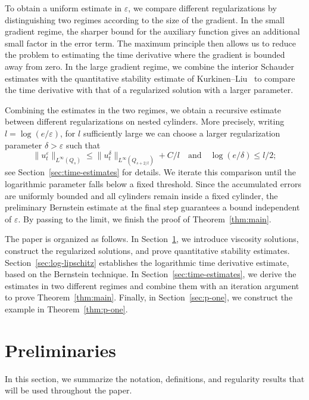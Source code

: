 \documentclass[a4paper,11pt]{amsart}
\theoremstyle{plain}
\theoremstyle{definition}
\numberwithin{equation}{section}
\begin{document}
To obtain a uniform estimate in $\varepsilon$, we compare different regularizations by distinguishing two regimes according to the size of the gradient. In the small gradient regime, the sharper bound for the auxiliary function gives an additional small factor in the error term. The maximum principle then allows us to reduce the problem to estimating the time derivative where the gradient is bounded away from zero. In the large gradient regime, we combine the interior Schauder estimates with the quantitative stability estimate of Kurkinen--Liu~\cite{KL26} to compare the time derivative with that of a regularized solution with a larger parameter.

Combining the estimates in the two regimes, we obtain a recursive estimate between different regularizations on nested cylinders. More precisely, writing $l=\log(e/\varepsilon)$, for $l$
sufficiently large we can choose a larger regularization parameter $\delta>\varepsilon$ such that
\begin{equation*}
    \|u_t^\varepsilon\|_{L^\infty(Q_s)}
    \leq \|u_t^\delta\|_{L^\infty(Q_{s+2/l})}
    +C/l \quad \text{and} \quad
    \log(e/\delta)\leq l/2;
\end{equation*}
see Section~\ref{sec:time-estimates} for details. We iterate this comparison until the logarithmic parameter falls below a fixed threshold. Since the accumulated errors are uniformly bounded and all cylinders remain inside a fixed cylinder, the preliminary Bernstein estimate at the final step guarantees a bound independent of $\varepsilon$. By passing to the limit, we finish the proof of Theorem~\ref{thm:main}.
\medskip

The paper is organized as follows. In Section~\ref{sec:preliminaries}, we introduce viscosity solutions, construct the regularized solutions, and prove quantitative stability estimates. Section~\ref{sec:log-lipschitz} establishes the logarithmic time derivative estimate, based on the Bernstein technique. In Section~\ref{sec:time-estimates}, we derive the estimates in two different regimes and combine them with an iteration argument to prove Theorem~\ref{thm:main}. Finally, in Section~\ref{sec:p-one}, we construct the example in Theorem~\ref{thm:p-one}.

\section{Preliminaries}\label{sec:preliminaries}

In this section, we summarize the notation, definitions, and regularity results that will be used throughout the paper.
\end{document}
